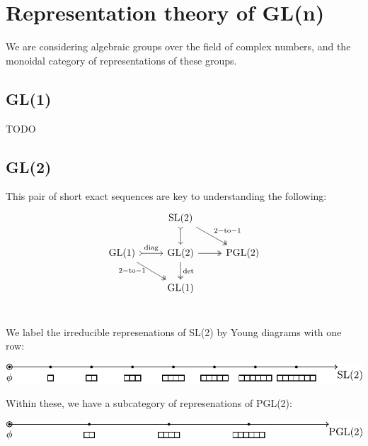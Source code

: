 \documentclass[11pt,oneside]{article}
\newcommand{\GL}{\mathrm{GL}}
\newcommand{\SL}{\mathrm{SL}}
\newcommand{\PGL}{\mathrm{PGL}}
\begin{document}
\section{Representation theory of GL(n)}

We are considering algebraic groups over the field of
complex numbers, and the monoidal category of representations of 
these groups.

\subsection{GL(1)}

TODO

\subsection{GL(2)}

This pair of short exact sequences are key
to understanding the following:
\[
\begin{tikzcd}
    &  
    \SL(2) \arrow[rightarrowtail]{d}\arrow[two heads]{dr}{\mathrm{2-to-1}} &  \\
    \GL(1) \arrow[rightarrowtail]{r}{\mathrm{diag}} 
           \arrow[two heads]{dr}[below,left]{\mathrm{2-to-1\ }}  &  
    \GL(2) \arrow[two heads]{r}\arrow[two heads]{d}{\mathrm{det}}  &  \PGL(2)     \\
    &  \GL(1)             &     \\
\end{tikzcd}
\]


We label the irreducible represenations of SL(2) by
Young diagrams with one row:
\begin{center}
\includegraphics[]{images/sl2.pdf}
\end{center}

Within these, we have a subcategory of represenations of PGL(2):
\begin{center}
\includegraphics[]{images/pgl2.pdf}
\end{center}
\end{document}
